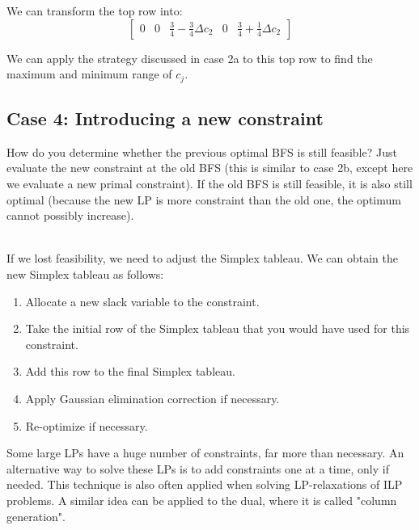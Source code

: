 \documentclass[12pt]{article}
\begin{document}
\noindent
We can transform the top row into:
\[ \begin{bmatrix}
    0 & 0 & \frac{3}{4} - \frac{3}{4}\Delta c_2 & 0 & \frac{3}{4} + \frac{1}{4}\Delta c_2
\end{bmatrix} \]

\noindent
We can apply the strategy discussed in case 2a to this top row to find the maximum and minimum range of $c_j$.

\subsection*{Case 4: Introducing a new constraint}
How do you determine whether the previous optimal BFS is still feasible?
Just evaluate the new constraint at the old BFS (this is similar to case 2b, except here we evaluate a new primal constraint).
If the old BFS is still feasible, it is also still optimal (because the new LP is more constraint than the old one, the optimum cannot possibly increase).

\noindent
\\
If we lost feasibility, we need to adjust the Simplex tableau.
We can obtain the new Simplex tableau as follows:

\begin{enumerate}
    \item Allocate a new slack variable to the constraint.
    \item Take the initial row of the Simplex tableau that you would have used for this constraint.
    \item Add this row to the final Simplex tableau.
    \item Apply Gaussian elimination correction if necessary.
    \item Re-optimize if necessary.
\end{enumerate}

\noindent
Some large LPs have a huge number of constraints, far more than necessary.
An alternative way to solve these LPs is to add constraints one at a time, only if needed.
This technique is also often applied when solving LP-relaxations of ILP problems.
A similar idea can be applied to the dual, where it is called "column generation".
\end{document}

